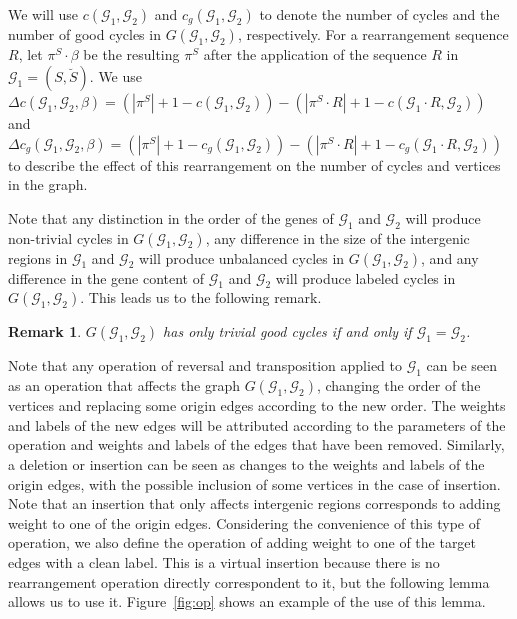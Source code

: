 \documentclass[12pt]{article}
\newtheorem{remark}{Remark}
\begin{document}
We will use $c(\mathcal{G}_1,\mathcal{G}_2)$ and $c_g(\mathcal{G}_1,\mathcal{G}_2)$ to denote the number of cycles and the number of good cycles in $G(\mathcal{G}_1,\mathcal{G}_2)$, respectively. For a rearrangement sequence $R$, let $\pi^S \cdot \beta$ be the resulting $\pi^S$ after the application of the sequence $R$ in $\mathcal{G}_1 = (S,\breve{S})$. We use $\Delta c(\mathcal{G}_1,\mathcal{G}_2,\beta) = (|\pi^S| + 1 - c(\mathcal{G}_1,\mathcal{G}_2)) - (|\pi^S \cdot R| + 1 - c(\mathcal{G}_1 \cdot R,\mathcal{G}_2))$ and $\Delta c_g(\mathcal{G}_1,\mathcal{G}_2,\beta) = (|\pi^S| + 1 - c_g(\mathcal{G}_1,\mathcal{G}_2)) - (|\pi^S \cdot R| + 1 - c_g(\mathcal{G}_1 \cdot R,\mathcal{G}_2))$ to describe the effect of this rearrangement on the number of cycles and vertices in the graph.

Note that any distinction in the order of the genes of $\mathcal{G}_1$ and $\mathcal{G}_2$ will produce non-trivial cycles in $G(\mathcal{G}_1,\mathcal{G}_2)$, any difference in the size of the intergenic regions in $\mathcal{G}_1$ and $\mathcal{G}_2$ will produce unbalanced cycles in $G(\mathcal{G}_1,\mathcal{G}_2)$, and any difference in the gene content of $\mathcal{G}_1$ and $\mathcal{G}_2$ will produce labeled cycles in $G(\mathcal{G}_1,\mathcal{G}_2)$. This leads us to the following remark.

\vspace{8pt}
\begin{remark}\label{remark:cyc}
$G(\mathcal{G}_1,\mathcal{G}_2)$ has only trivial good cycles if and only if $\mathcal{G}_1 = \mathcal{G}_2$.
\end{remark}

Note that any operation of reversal and transposition applied to $\mathcal{G}_1$ can be seen as an operation that affects the graph $G(\mathcal{G}_1,\mathcal{G}_2)$, changing the order of the vertices and replacing some origin edges according to the new order. The weights and labels of the new edges will be attributed according to the parameters of the operation and weights and labels of the edges that have been removed. Similarly, a deletion or insertion can be seen as changes to the weights and labels of the origin edges, with the possible inclusion of some vertices in the case of insertion. Note that an insertion that only affects intergenic regions corresponds to adding weight to one of the origin edges. Considering the convenience of this type of operation, we also define the operation of adding weight to one of the target edges with a clean label. This is a virtual insertion because there is no rearrangement operation directly correspondent to it, but the following lemma allows us to use it. Figure~\ref{fig:op} shows an example of the use of this lemma.
\end{document}

